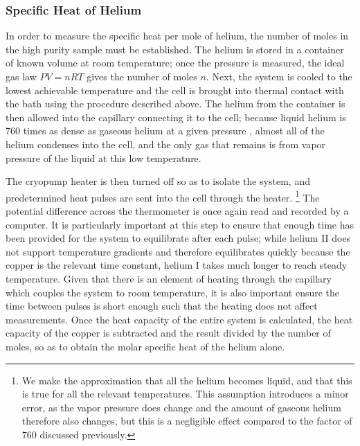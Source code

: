 \subsubsection{Specific Heat of Helium}
In order to measure the specific heat per mole of helium, the number
of moles in the high purity sample must be established. The helium is
stored in a container of known volume at room temperature; once the
pressure is measured, the ideal gas law $P V = n R T$ gives the number
of moles $n$. Next, the system is cooled to the lowest achievable
temperature and the cell is brought into thermal contact with the bath
using the procedure described above. The helium from the container is
then allowed into the capillary connecting it to the cell; because
liquid helium is $760$ times as dense as gaseous helium at a given
pressure \cite{shi}, almost all of the helium condenses into the cell,
and the only gas that remains is from vapor pressure of the liquid at
this low temperature. 

The cryopump heater is then turned off so as to isolate the system,
and predetermined heat pulses are sent into the cell through the
heater. \footnote{We make the approximation that all the helium
  becomes liquid, and that this is true for all the relevant
  temperatures. This assumption introduces a minor error, as the vapor
  pressure does change and the amount of gaseous helium therefore also
  changes, but this is a negligible effect compared to the factor of
  $760$ discussed previously.} The potential difference across the
thermometer is once again read and recorded by a computer. It is
particularly important at this step to ensure that enough time has
been provided for the system to equilibrate after each pulse; while
helium II does not support temperature gradients and therefore
equilibrates quickly because the copper is the relevant time constant,
helium I takes much longer to reach steady temperature. Given that
there is an element of heating through the capillary which couples the
system to room temperature, it is also important ensure the time
between pulses is short enough such that the heating does not affect
measurements.  Once the heat capacity of the entire system is
calculated, the heat capacity of the copper is subtracted and the
result divided by the number of moles, so as to obtain the molar
specific heat of the helium alone.
